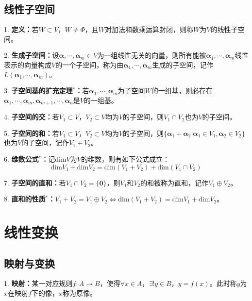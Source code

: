 \subsection{线性子空间}

1. \textbf{定义：}若$W\subset V$，$W\neq \Phi$，且$W$对加法和数乘运算封闭，则称$W$为$V$的线性子空间。

2. \textbf{生成子空间：}设$\boldsymbol{\alpha},\cdots,\boldsymbol{\alpha}_m\in V$为一组线性无关的向量，则所有能被$\boldsymbol{\alpha}_1,\cdots,\boldsymbol{\alpha}_m$线性表示的向量构成$V$的一个子空间，称为由$\boldsymbol{\alpha}_1,\cdots,\boldsymbol{\alpha}_m$生成的子空间，记作
$L(\boldsymbol{\alpha}_1,\cdots,\boldsymbol{\alpha}_m)$。

3. \textbf{子空间基的扩充定理$^*$：}若$\boldsymbol{\alpha}_1,\cdots,\boldsymbol{\alpha}_m$为子空间$W$的一组基，则必存在$\boldsymbol{\alpha}_1,\cdots,\boldsymbol{\alpha}_m,\boldsymbol{\alpha}_{m+1},\cdots,\boldsymbol{\alpha}_n$是$V$的一组基。

4. \textbf{子空间的交：}若$V_1\subset V$，$V_2\subset V$均为$V$的子空间，则$V_1\cap V_2$也为$V$的子空间。

5. \textbf{子空间的和：}若$V_1\subset V$，$V_2\subset V$均为$V$的子空间，则$\{\boldsymbol{\alpha}_1+\boldsymbol{\alpha}_2|\boldsymbol{\alpha}_1\in V_1,\boldsymbol{\alpha}_2\in V_2\}$也为$V$的子空间，记作$V_1+V_2$。

6. \textbf{维数公式$^*$：}记dim$V$为$V$的维数，则有如下公式成立：
\begin{equation*}
    \text{dim}V_1+\text{dim}V_2=\text{dim}(V_1+V_2)+\text{dim}(V_1\cap V_2)
\end{equation*}

7. \textbf{子空间的直和：}若$V_1\cap V_2=\{\boldsymbol{0}\}$，则$V_1$和$V_2$的和被称为直和，记作$V_1\oplus V_2$。

8. \textbf{直和的性质$^*$：}$V_1+V_2=V_1\oplus V_2 \Leftrightarrow \text{dim}(V_1+V_2)=\text{dim}V_1+\text{dim}V_2$。

\section{线性变换}

\subsection{映射与变换}

1. \textbf{映射：}某一对应规则$f:A\rightarrow B$，使得$\forall x \in A$，$\exists ! y \in B$，$y=f(x)$。此时称$y$为$x$在映射$f$下的像，$x$称为原像。

